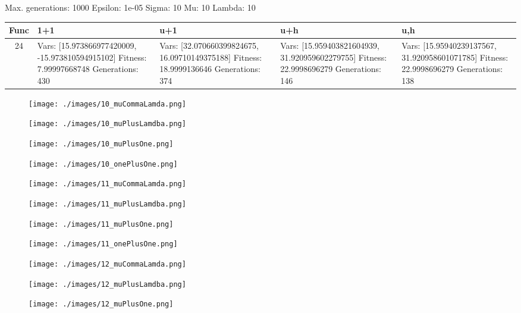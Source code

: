 \documentclass[landscape,11pt]{article}
\begin{document}
\newpage
Max. generations: 1000 Epsilon: 1e-05 Sigma: 10 Mu: 10 Lambda: 10 \\
\begin{tabular}{|c|p{5.4cm}|p{5.4cm}|p{5.4cm}|p{5.4cm}|}
\hline
Func & 1+1 & u+1 & u+h & u,h \\ 
\hline 24 & Vars: [15.973866977420009, -15.973810594915102] Fitness: 7.99997668748 Generations: 430 & Vars: [32.070660399824675, 16.09710149375188] Fitness: 18.9999136646 Generations: 374 & Vars: [15.959403821604939, 31.920959602279755] Fitness: 22.9998696279 Generations: 146 & Vars: [15.95940239137567, 31.920958601071785] Fitness: 22.9998696279 Generations: 138 \\
 \hline 
\end{tabular}
\begin{figure}
    \centering
    \texttt{[image: ./images/10\_muCommaLamda.png]}
\end{figure}\begin{figure}
    \centering
    \texttt{[image: ./images/10\_muPlusLamdba.png]}
\end{figure}\begin{figure}
    \centering
    \texttt{[image: ./images/10\_muPlusOne.png]}
\end{figure}\begin{figure}
    \centering
    \texttt{[image: ./images/10\_onePlusOne.png]}
\end{figure}\begin{figure}
    \centering
    \texttt{[image: ./images/11\_muCommaLamda.png]}
\end{figure}\begin{figure}
    \centering
    \texttt{[image: ./images/11\_muPlusLamdba.png]}
\end{figure}\begin{figure}
    \centering
    \texttt{[image: ./images/11\_muPlusOne.png]}
\end{figure}\begin{figure}
    \centering
    \texttt{[image: ./images/11\_onePlusOne.png]}
\end{figure}\begin{figure}
    \centering
    \texttt{[image: ./images/12\_muCommaLamda.png]}
\end{figure}\begin{figure}
    \centering
    \texttt{[image: ./images/12\_muPlusLamdba.png]}
\end{figure}\begin{figure}
    \centering
    \texttt{[image: ./images/12\_muPlusOne.png]}

\end{figure}
\end{document}
